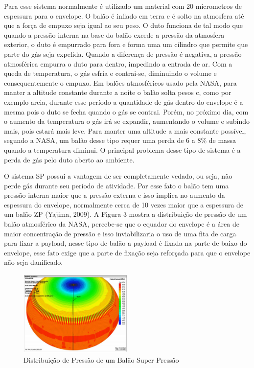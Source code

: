 	Para esse sistema normalmente é utilizado um material com 20 micrometros de espessura para o envelope. O balão é inflado em terra e é solto na atmosfera até que a força de empuxo seja igual ao seu peso. O duto funciona de tal modo que quando a pressão interna na base do balão excede a pressão da atmosfera exterior, o duto é empurrado para fora e forma uma um cilindro que permite que parte do gás seja expelida. Quando a diferença de pressão é negativa, a pressão atmosférica empurra o duto para dentro, impedindo a entrada de ar. Com a queda de temperatura, o gás esfria e contrai-se, diminuindo o volume e consequentemente o empuxo. Em balões atmosféricos usado pela NASA, para manter a altitude constante durante a noite o balão solta pesos c, como por exemplo areia, durante esse período a quantidade de gás dentro do envelope é a mesma pois o duto se fecha quando o gás se contrai. Porém, no próximo dia, com o aumento da temperatura o gás irá se expandir, aumentando o volume e subindo mais, pois estará mais leve. Para manter uma altitude a mais constante possível, segundo a NASA, um balão desse tipo requer uma perda de 6 a 8\% de massa quando a temperatura diminui. O principal problema desse tipo de sistema é a perda de gás pelo duto aberto ao ambiente.

	O sistema SP possui a vantagem de ser completamente vedado, ou seja, não perde gás durante seu período de atividade. Por esse fato o balão tem uma pressão interna maior que a pressão externa e isso implica no aumento da espessura do envelope, normalmente cerca de 10 vezes maior que a espessura de um balão ZP (Yajima, 2009). A Figura 3 mostra a distribuição de pressão de um balão atmosférico da NASA, percebe-se que o equador do envelope é a área de maior concentração de pressão e isso inviabilizaria o uso de uma fita de carga para fixar a payload, nesse tipo de balão a payload é fixada na parte de baixo do envelope, esse fato exige que a parte de fixação seja reforçada para que o envelope não seja danificado.

	\begin{figure}[H]
		\centering
		\includegraphics[width=0.5\textwidth]{figuras/distribuicaoPressao}
		\caption[Distribuição de Pressão de um Balão Super Pressão]{Distribuição de Pressão de um Balão Super Pressão~\cite{nasa2}}
		\label{img:distribuicaoPressao}
	\end{figure}

